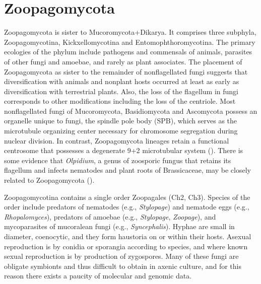 \documentclass[]{book}
\begin{document}
\section{Zoopagomycota}\label{zoopagomycota}

Zoopagomycota is sister to Mucoromycota+Dikarya. It comprises three
subphyla, Zoopagomycotina, Kickxellomycotina and Entomophthoromycotina.
The primary ecologies of the phylum include pathogens and commensals of
animals, parasites of other fungi and amoebae, and rarely as plant
associates. The placement of Zoopagomycota as sister to the remainder of
nonflagellated fungi suggests that diversification with animals and
nonplant hosts occurred at least as early as diversification with
terrestrial plants. Also, the loss of the flagellum in fungi corresponds
to other modifications including the loss of the centriole. Most
nonflagellated fungi of Mucoromycota, Basidiomycota and Ascomycota
possess an organelle unique to fungi, the spindle pole body (SPB), which
serves as the microtubule organizing center necessary for chromosome
segregation during nuclear division. In contrast, Zoopagomycota lineages
retain a functional centrosome that possesses a degenerate 9+2
microtubular system (\citet{McLaughlin_2015}). There is some evidence
that \emph{Olpidium}, a genus of zoosporic fungus that retains its
flagellum and infects nematodes and plant roots of Brassicaceae, may be
closely related to Zoopagomycota (\citet{Sekimoto_2011}).

Zoopagomycotina contains a single order Zoopagales (Ch2, Ch3). Species
of the order include predators of nematodes (e.g., \emph{Stylopage}) and
nematode eggs (e.g., \emph{Rhopalomyces}), predators of amoebae (e.g.,
\emph{Stylopage}, \emph{Zoopage}), and mycoparasites of mucoralean fungi
(e.g., \emph{Syncephalis}). Hyphae are small in diameter, coenocytic,
and they form haustoria on or within their hosts. Asexual reproduction
is by conidia or sporangia according to species, and where known sexual
reproduction is by production of zygospores. Many of these fungi are
obligate symbionts and thus difficult to obtain in axenic culture, and
for this reason there exists a paucity of molecular and genomic data.
\end{document}
